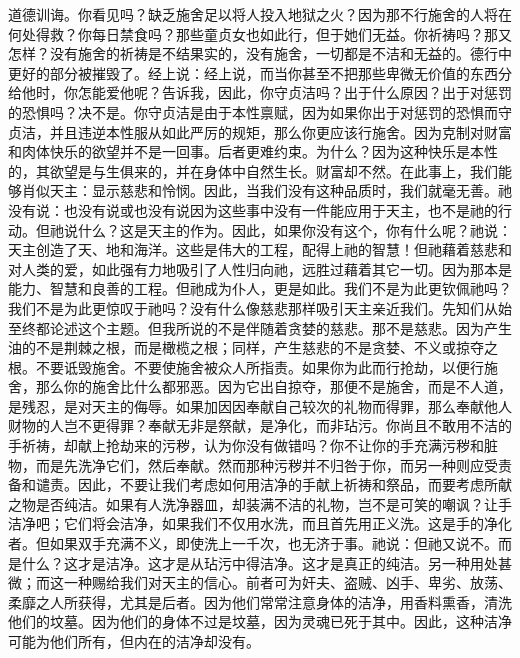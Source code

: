 道德训诲。你看见吗？缺乏施舍足以将人投入地狱之火？因为那不行施舍的人将在何处得救？你每日禁食吗？那些童贞女也如此行，但于她们无益。你祈祷吗？那又怎样？没有施舍的祈祷是不结果实的，没有施舍，一切都是不洁和无益的。德行中更好的部分被摧毁了。经上说：经上说，而当你甚至不把那些卑微无价值的东西分给他时，你怎能爱他呢？告诉我，因此，你守贞洁吗？出于什么原因？出于对惩罚的恐惧吗？决不是。你守贞洁是由于本性禀赋，因为如果你出于对惩罚的恐惧而守贞洁，并且违逆本性服从如此严厉的规矩，那么你更应该行施舍。因为克制对财富和肉体快乐的欲望并不是一回事。后者更难约束。为什么？因为这种快乐是本性的，其欲望是与生俱来的，并在身体中自然生长。财富却不然。在此事上，我们能够肖似天主：显示慈悲和怜悯。因此，当我们没有这种品质时，我们就毫无善。祂没有说：也没有说或也没有说因为这些事中没有一件能应用于天主，也不是祂的行动。但祂说什么？这是天主的作为。因此，如果你没有这个，你有什么呢？祂说：天主创造了天、地和海洋。这些是伟大的工程，配得上祂的智慧！但祂藉着慈悲和对人类的爱，如此强有力地吸引了人性归向祂，远胜过藉着其它一切。因为那本是能力、智慧和良善的工程。但祂成为仆人，更是如此。我们不是为此更钦佩祂吗？我们不是为此更惊叹于祂吗？没有什么像慈悲那样吸引天主亲近我们。先知们从始至终都论述这个主题。但我所说的不是伴随着贪婪的慈悲。那不是慈悲。因为产生油的不是荆棘之根，而是橄榄之根；同样，产生慈悲的不是贪婪、不义或掠夺之根。不要诋毁施舍。不要使施舍被众人所指责。如果你为此而行抢劫，以便行施舍，那么你的施舍比什么都邪恶。因为它出自掠夺，那便不是施舍，而是不人道，是残忍，是对天主的侮辱。如果加因因奉献自己较次的礼物而得罪，那么奉献他人财物的人岂不更得罪？奉献无非是祭献，是净化，而非玷污。你尚且不敢用不洁的手祈祷，却献上抢劫来的污秽，认为你没有做错吗？你不让你的手充满污秽和脏物，而是先洗净它们，然后奉献。然而那种污秽并不归咎于你，而另一种则应受责备和谴责。因此，不要让我们考虑如何用洁净的手献上祈祷和祭品，而要考虑所献之物是否纯洁。如果有人洗净器皿，却装满不洁的礼物，岂不是可笑的嘲讽？让手洁净吧；它们将会洁净，如果我们不仅用水洗，而且首先用正义洗。这是手的净化者。但如果双手充满不义，即使洗上一千次，也无济于事。祂说：但祂又说不。而是什么？这才是洁净。这才是从玷污中得洁净。这才是真正的纯洁。另一种用处甚微；而这一种赐给我们对天主的信心。前者可为奸夫、盗贼、凶手、卑劣、放荡、柔靡之人所获得，尤其是后者。因为他们常常注意身体的洁净，用香料熏香，清洗他们的坟墓。因为他们的身体不过是坟墓，因为灵魂已死于其中。因此，这种洁净可能为他们所有，但内在的洁净却没有。\par

